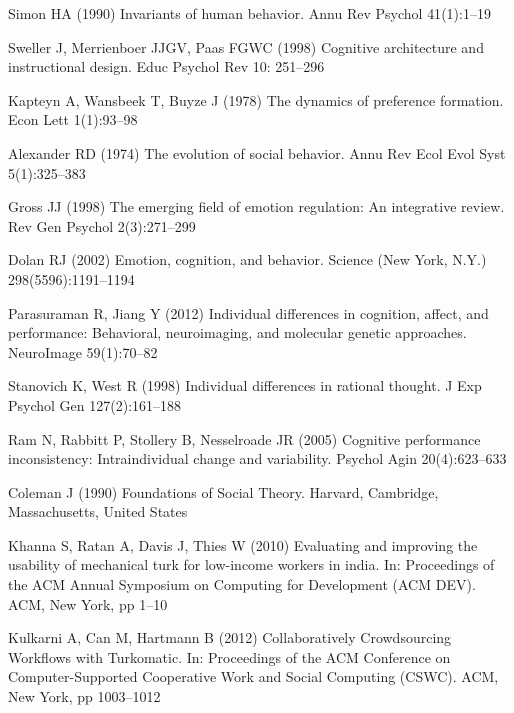 \documentclass[11pt]{bmc_article_s50}
\begin{document}
\begin{thebibliography}{000}
Simon HA (1990)
{Invariants of human behavior.}
{Annu Rev Psychol}
{41}(1):1--{19}



Sweller J,
Merrienboer JJGV,
Paas FGWC (1998)
{Cognitive architecture and instructional design}.
{Educ Psychol Rev}
{10}:
251--{296}



Kapteyn A,
Wansbeek T,
Buyze J (1978)
{The dynamics of preference formation}.
{Econ Lett}
{1}(1):93--{98}



Alexander RD (1974)
{The evolution of social behavior}.
{Annu Rev Ecol Evol Syst}
{5}(1):325--{383}



Gross JJ (1998)
{The emerging field of emotion regulation: An integrative review.}
{Rev Gen Psychol}
{2}(3):271--{299}



Dolan RJ (2002)
Emotion, cognition, and behavior.
Science (New York, N.Y.)
{298}(5596):1191--{1194}


Parasuraman R,
Jiang Y (2012)
{Individual differences in cognition, affect, and performance:
  Behavioral, neuroimaging, and molecular genetic approaches}.
{NeuroImage}
{59}(1):70--{82}



Stanovich K,
West R (1998)
{Individual differences in rational thought}.
{J Exp Psychol Gen}
{127}(2):161--{188}



Ram N,
Rabbitt P,
Stollery B,
Nesselroade JR (2005)
{Cognitive performance inconsistency: Intraindividual change and
  variability.}
{Psychol Agin}
{20}(4):623--{633}



Coleman J (1990)
{Foundations of Social Theory}.
{Harvard},
{Cambridge, Massachusetts, United States}



Khanna S,
Ratan A,
Davis J,
Thies W (2010)
{Evaluating and improving the usability of mechanical turk for
  low-income workers in india}.
In: {Proceedings of the ACM Annual Symposium on Computing for Development (ACM DEV)}.
{ACM},
{New York},
pp 1--{10}

Kulkarni A,
Can M,
Hartmann B (2012)
{{Collaboratively Crowdsourcing Workflows with Turkomatic}}.
In: {Proceedings of the ACM Conference on Computer-Supported
  Cooperative Work and Social Computing (CSWC)}.
{ACM},
{New York,} pp 1003--{1012}


\end{thebibliography}
\end{document}
